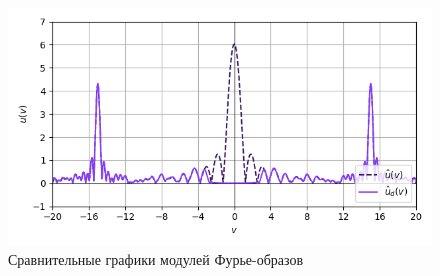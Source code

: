 \documentclass[a4paper]{article}
\begin{document}
\begin{figure}[H]
\begin{minipage}{0.33\textwidth}
        \centering \includegraphics[width=\textwidth]{sources/high-pass filter/fourier (b=2, c=1.5, d=15, v=3).png}
        \caption{$b = 2, c = 1.5, d = 15, v = 3$}
    \end{minipage}
    \caption*{Сравнительные графики модулей Фурье-образов}
\end{figure}
\end{document}
